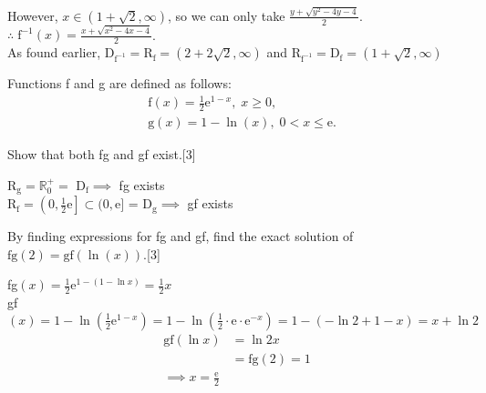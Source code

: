\documentclass[12pt, a4 paper]{article}
\begin{document}
\begin{outline}[enumerate]
\begin{answer}
  However, \(x \in (1+\sqrt{2},\infty)\), so we can only take \(\frac{y+\sqrt{y^2-4y-4}}{2}\).\\
  \(\therefore \;\textrm{f}^{-1}(x)=\frac{x+\sqrt{x^2-4x-4}}{2}\).\\
  As found earlier, \(\textrm{D}_{\textrm{f}^{-1}}=\textrm{R}_{\textrm{f}}=(2+2\sqrt{2},\infty)\) and \(\textrm{R}_{\textrm{f}^{-1}}=\textrm{D}_{\textrm{f}}=(1+\sqrt{2},\infty)\)
 \end{answer}
 \1 Functions f and g are defined as follows:
 \begin{align*}
   & \textrm{f}(x)=\frac{1}{2}\mathrm{e}^{1-x},\;x\geq0, \\
   & \textrm{g}(x)=1-\ln{(x)},\;0<x\leq{\mathrm{e}}.
 \end{align*} %

 \2 Show that both fg and gf exist.\hfill[3]
 \begin{answer}
  \vspace{3mm}
  \color{black}
  \color{blue}
  R\(_\textrm{g} = \mathbb{R}^+_0 =\) D\(_\textrm{f}\implies \) fg exists \\
  R\(_\textrm{f} = \left(0,\frac{1}{2}\mathrm{e}\right] \subset (0,\mathrm{e}] \) = D\(_\textrm{g}\implies \) gf exists
 \end{answer}

 \2 By finding expressions for fg and gf, find the exact solution of \(\textrm{fg}(2)=\textrm{gf}(\ln{(x)})\).\hfill[3]\\
 \begin{answer}
  fg\((x)=\frac{1}{2}\mathrm{e}^{1-(1-\ln{x})} = \frac{1}{2}x\) \\
  gf\((x) = 1-\ln{(\frac{1}{2}\mathrm{e}^{1-x})} = 1-\ln{(\frac{1}{2}\cdot \mathrm{e} \cdot \mathrm{e}^{-x})} = 1-(-\ln2+1-x) = x+\ln2\)
  \begin{align*}
   \textrm{gf}(\ln x) & = \ln2x              \\
                      & = \textrm{fg}(2) = 1 \\
   \implies x=\frac{\mathrm{e}}{2}
  \end{align*}
 \end{answer}


\end{outline}
\end{document}
